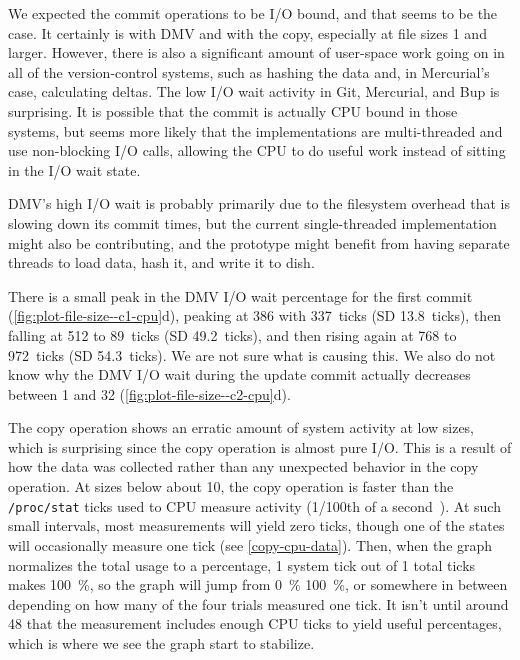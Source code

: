 We expected the commit operations to be I/O bound, and that seems to be the
case. It certainly is with DMV and with the copy, especially at file sizes
\SI{1}{\gib} and larger. However, there is also a significant amount of
user-space work going on in all of the version-control systems, such as hashing
the data and, in Mercurial's case, calculating deltas. The low I/O wait activity
in Git, Mercurial, and Bup is surprising. It is possible that the commit is
actually CPU bound in those systems, but seems more likely that the
implementations are multi-threaded and use non-blocking I/O calls, allowing the
CPU to do useful work instead of sitting in the I/O wait state.

DMV's high I/O wait is probably primarily due to the filesystem overhead that is
slowing down its commit times, but the current single-threaded implementation
might also be contributing, and the prototype might benefit from having separate
threads to load data, hash it, and write it to dish.

There is a small peak in the DMV I/O wait percentage for the first commit
(\autoref{fig:plot-file-size--c1-cpu}d), peaking at \SI{386}{\mib} with
\SI{337}{ticks} (SD \SI{13.8}{ticks}), then falling at \SI{512}{\mib} to
\SI{89}{ticks} (SD \SI{49.2}{ticks}), and then rising again at \SI{768}{\mib} to
\SI{972}{ticks} (SD \SI{54.3}{ticks}). We are not sure what is causing this. We
also do not know why the DMV I/O wait during the update commit actually
decreases between \SI{1}{\gib} and \SI{32}{\gib}
(\autoref{fig:plot-file-size--c2-cpu}d).


The copy operation shows an erratic amount of system activity at low sizes,
which is surprising since the copy operation is almost pure I/O. This is a
result of how the data was collected rather than any unexpected behavior in the
copy operation. At sizes below about \SI{10}{\mib}, the copy operation is faster
than the \lstinline{/proc/stat} ticks used to CPU measure activity
(\num{1/100}{th} of a second~\cite{proc_man_page}). At such small intervals,
most measurements will yield zero ticks, though one of the states will
occasionally measure one tick (see \autoref{copy-cpu-data}). Then, when the
graph normalizes the total usage to a percentage, \num{1} system tick out of
\num{1} total ticks makes \SI{100}{\percent}, so the graph will jump from
\SI{0}{\percent} \SI{100}{\percent}, or somewhere in between depending on how
many of the four trials measured one tick. It isn't until around \SI{48}{\mib}
that the measurement includes enough CPU ticks to yield useful percentages,
which is where we see the graph start to stabilize.


